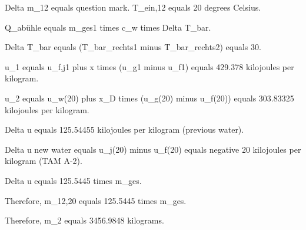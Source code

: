Delta m_12 equals question mark.
T_ein,12 equals 20 degrees Celsius.

Q_abühle equals m_ges1 times c_w times Delta T_bar.

Delta T_bar equals (T_bar_rechts1 minus T_bar_rechts2) equals 30.

u_1 equals u_f,j1 plus x times (u_g1 minus u_f1) equals 429.378 kilojoules per kilogram.

u_2 equals u_w(20) plus x_D times (u_g(20) minus u_f(20)) equals 303.83325 kilojoules per kilogram.

Delta u equals 125.54455 kilojoules per kilogram (previous water).

Delta u new water equals u_j(20) minus u_f(20) equals negative 20 kilojoules per kilogram (TAM A-2).

Delta u equals 125.5445 times m_ges.

Therefore, m_12,20 equals 125.5445 times m_ges.

Therefore, m_2 equals 3456.9848 kilograms.